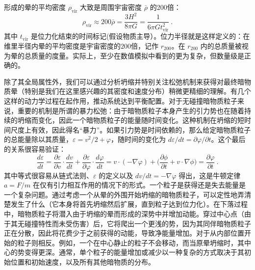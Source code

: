 形成的晕的平均密度 \(\rho_{\text{vir}}\) 大致是周围宇宙密度 \(\bar{\rho}\) 的200倍：
\begin{equation}
\rho_{\text{vir}} \approx 200 \bar{\rho} = \frac{3H^2}{8\pi G} = \frac{1}{6\pi G t^2_{\text{vir}}}~. 
\end{equation}
其中 \(t_{\text{vir}}\) 是位力化结束的时间标记(假设物质主导）。位力半径就是这样定义的：在维里半径内晕的平均密度是宇宙密度的$200$倍，记作 \(r_{200}\)。在 \(r_{200}\) 内的总质量被视为晕的总质量的度量。实际上，至少在数值模拟中看到的更为复杂，但数量级是正确的。

除了其全局属性外，我们可以通过分析坍缩并特别关注松弛机制来获得对最终暗物质晕（特别是我们在这里感兴趣的其密度和速度分布）稍微更精细的理解。有几个这样的动力学过程在起作用，推动系统达到平衡配置。对于无碰撞暗物质粒子来说，重要的机制是所谓的暴力松弛：由于暗物质粒子本身产生的引力势也在随着持续的坍缩而变化，因此一个暗物质粒子的能量随时间变化。这种机制在坍缩的短时间尺度上有效，因此得名“暴力”。如果引力势是时间依赖的，那么给定暗物质粒子的总能量除以其质量，\(\varepsilon = v^2/2 + \varphi\)，随时间的变化为 \(d\varepsilon/dt = \partial\varphi/\partial t\)。这个最后的关系很容易验证：
\begin{equation}
\frac{d\varepsilon}{dt} = \frac{\partial\varepsilon}{\partial v} \cdot \frac{dv}{dt} + \frac{\partial\varepsilon}{\partial\varphi} \cdot \frac{d\varphi}{dt} = v \cdot (-\nabla\varphi) +  \bigg(\frac{\partial\phi}{\partial t} + v \cdot \nabla\phi \bigg) =  \frac{\partial\varphi}{\partial t}~. 
\end{equation}
其中等式很容易从链式法则、\(\varepsilon\) 的定义以及 \(dv/dt = -\nabla\varphi\) 得出，这是牛顿定律 \(a = F/m\) 在仅有引力相互作用的情况下的形式。一个粒子是获得还是失去能量是一个复杂问题。通过考虑一个从晕的外围开始坍缩的暗物质粒子，可以定性地弄清楚发生了什么（它本身将首先坍缩然后扩展，直到粒子达到位力化）。在下落过程中，暗物质粒子将潜入由于坍缩的晕而形成的深势中并增加动能。穿过中心点（由于其无碰撞特性而未受伤害）后，它将爬出一个更浅的势，因为其同伴暗物质粒子正在分散，因此将花费少于之前获得的动能，导致净能量增加。对于从内部位置开始的粒子则相反。例如，一个在中心静止的粒子不会移动，而当原晕坍缩时，其中心的势变得更深。通常，单个粒子的能量增加或减少以一种复杂的方式取决于其初始位置和初始速度，以及所有其他暗物质的分布。

